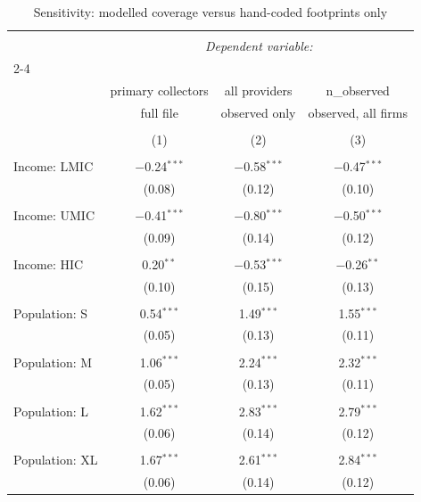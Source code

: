 
\begin{table}[!htbp] \centering 
  \caption{Sensitivity: modelled coverage versus hand-coded footprints only} 
  \label{} 
\begin{tabular}{@{\extracolsep{5pt}}lccc} 
\\[-1.8ex]\hline 
\hline \\[-1.8ex] 
 & \multicolumn{3}{c}{\textit{Dependent variable:}} \\ 
\cline{2-4} 
\\[-1.8ex] & primary collectors & all providers & n\_observed \\ 
 & full file & observed only & observed, all firms \\ 
\\[-1.8ex] & (1) & (2) & (3)\\ 
\hline \\[-1.8ex] 
 Income: LMIC & $-$0.24$^{***}$ & $-$0.58$^{***}$ & $-$0.47$^{***}$ \\ 
  & (0.08) & (0.12) & (0.10) \\ 
  & & & \\ 
 Income: UMIC & $-$0.41$^{***}$ & $-$0.80$^{***}$ & $-$0.50$^{***}$ \\ 
  & (0.09) & (0.14) & (0.12) \\ 
  & & & \\ 
 Income: HIC & 0.20$^{**}$ & $-$0.53$^{***}$ & $-$0.26$^{**}$ \\ 
  & (0.10) & (0.15) & (0.13) \\ 
  & & & \\ 
 Population: S & 0.54$^{***}$ & 1.49$^{***}$ & 1.55$^{***}$ \\ 
  & (0.05) & (0.13) & (0.11) \\ 
  & & & \\ 
 Population: M & 1.06$^{***}$ & 2.24$^{***}$ & 2.32$^{***}$ \\ 
  & (0.05) & (0.13) & (0.11) \\ 
  & & & \\ 
 Population: L & 1.62$^{***}$ & 2.83$^{***}$ & 2.79$^{***}$ \\ 
  & (0.06) & (0.14) & (0.12) \\ 
  & & & \\ 
 Population: XL & 1.67$^{***}$ & 2.61$^{***}$ & 2.84$^{***}$ \\ 
  & (0.06) & (0.14) & (0.12) \\ 

\end{tabular}
\end{table}

